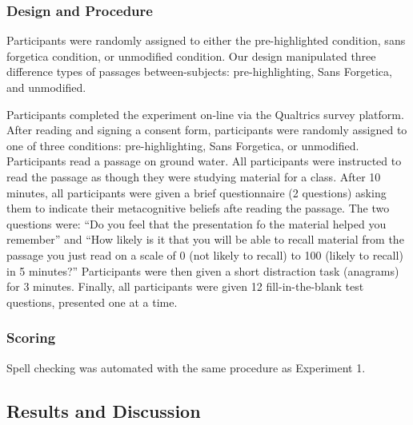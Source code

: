 \documentclass[english,pdf]{apa6}
\begin{document}
\hypertarget{design-and-procedure-1}{%
\subsubsection{Design and Procedure}\label{design-and-procedure-1}}

Participants were randomly assigned to either the pre-highlighted condition, sans forgetica condition, or unmodified condition. Our design manipulated three difference types of passages between-subjects: pre-highlighting, Sans Forgetica, and unmodified.

Participants completed the experiment on-line via the Qualtrics survey platform. After reading and signing a consent form, participants were randomly assigned to one of three conditions: pre-highlighting, Sans Forgetica, or unmodified. Participants read a passage on ground water. All participants were instructed to read the passage as though they were studying material for a class. After 10 minutes, all participants were given a brief questionnaire (2 questions) asking them to indicate their metacognitive beliefs afte reading the passage. The two questions were: \enquote{Do you feel that the presentation fo the material helped you remember} and \enquote{How likely is it that you will be able to recall material from the passage you just read on a scale of 0 (not likely to recall) to 100 (likely to recall) in 5 minutes?} Participants were then given a short distraction task (anagrams) for 3 minutes. Finally, all participants were given 12 fill-in-the-blank test questions, presented one at a time.

\hypertarget{scoring-1}{%
\subsubsection{Scoring}\label{scoring-1}}

Spell checking was automated with the same procedure as Experiment 1.

\hypertarget{results-and-discussion-1}{%
\subsection{Results and Discussion}\label{results-and-discussion-1}}
\end{document}
